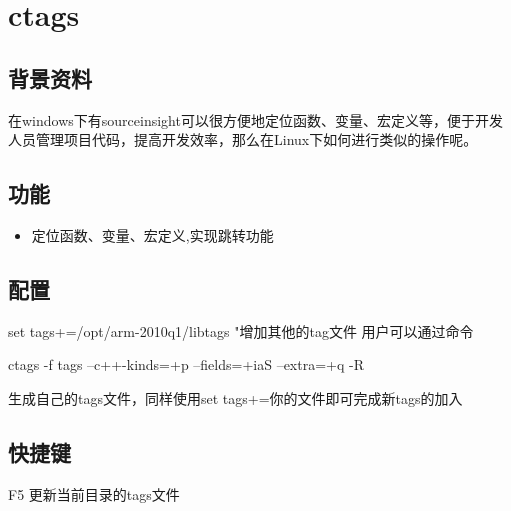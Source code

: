\chapter{ctags}

\section{背景资料}
在windows下有sourceinsight可以很方便地定位函数、变量、宏定义等，便于开发人员管理项目代码，提高开发效率，那么在Linux下如何进行类似的操作呢。

\section{功能}
\begin{itemize}
    \item 定位函数、变量、宏定义,实现跳转功能
\end{itemize}


\section{配置}
set tags+=/opt/arm-2010q1/libtags "增加其他的tag文件
用户可以通过命令
\begin{code}
ctags -f tags --c++-kinds=+p --fields=+iaS --extra=+q -R
\end{code}
生成自己的tags文件，同样使用set tags+=你的文件即可完成新tags的加入

\section{快捷键}
F5 更新当前目录的tags文件

\newpage
